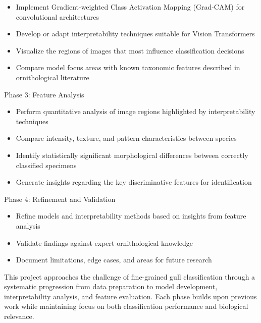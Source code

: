 \begin{itemize}
\item Implement Gradient-weighted Class Activation Mapping (Grad-CAM) for convolutional architectures


\item Develop or adapt interpretability techniques suitable for Vision Transformers


\item Visualize the regions of images that most influence classification decisions


\item Compare model focus areas with known taxonomic features described in ornithological literature


\end{itemize}
Phase 3: Feature Analysis

\begin{itemize}
\item Perform quantitative analysis of image regions highlighted by interpretability techniques


\item Compare intensity, texture, and pattern characteristics between species


\item Identify statistically significant morphological differences between correctly classified specimens


\item Generate insights regarding the key discriminative features for identification


\end{itemize}
Phase 4: Refinement and Validation

\begin{itemize}
\item Refine models and interpretability methods based on insights from feature analysis


\item Validate findings against expert ornithological knowledge


\item Document limitations, edge cases, and areas for future research


\end{itemize}


This project approaches the challenge of fine-grained gull classification through a systematic progression from data preparation to model development, interpretability analysis, and feature evaluation. Each phase builds upon previous work while maintaining focus on both classification performance and biological relevance.

